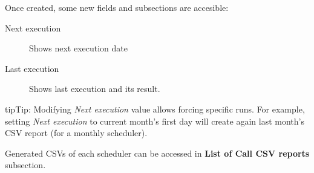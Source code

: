 \documentclass[letterpaper,10pt,english]{sphinxmanual}
\begin{document}
Once created, some new fields and subsections are accesible:
\begin{description}
\item[{Next execution}] \leavevmode{}\label{administration_portal/client/residential/calls/call_csv_schedulers:term-next-execution}
Shows next execution date

\item[{Last execution}] \leavevmode{}\label{administration_portal/client/residential/calls/call_csv_schedulers:term-last-execution}
Shows last execution and its result.

\end{description}

\begin{notice}{tip}{Tip:}
Modifying \emph{Next execution} value allows forcing specific runs. For example, setting \emph{Next execution} to
current month's first day will create again last month's CSV report (for a monthly scheduler).
\end{notice}

Generated CSVs of each scheduler can be accessed in \textbf{List of Call CSV reports} subsection.
\end{document}

